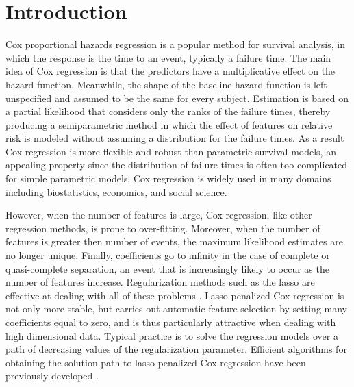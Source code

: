 \section{Introduction}

Cox proportional hazards regression \citep{cox1972regression} is a popular method for survival analysis, in which the response is the time to an event, typically a failure time. The main idea of Cox regression is that the predictors have a multiplicative effect on the hazard function. Meanwhile, the shape of the baseline hazard function is left unspecified and assumed to be the same for every subject. Estimation is based on a partial likelihood that considers only the ranks of the failure times, thereby producing a semiparametric method in which the effect of features on relative risk is modeled without assuming a distribution for the failure times. As a result Cox regression is more flexible and robust than parametric survival models, an appealing property since the distribution of failure times is often too complicated for simple parametric models. Cox regression is widely used in many domains including biostatistics, economics, and social science.

However, when the number of features is large, Cox regression, like other regression methods, is prone to over-fitting. Moreover, when the number of features is greater then number of events, the maximum likelihood estimates are no longer unique. Finally, coefficients go to infinity in the case of complete or quasi-complete separation, an event that is increasingly likely to occur as the number of features increase. Regularization methods such as the lasso are effective at dealing with all of these problems \citep{tibshirani1997lasso}. Lasso penalized Cox regression is not only more stable, but carries out automatic feature selection by setting many coefficients equal to zero, and is thus particularly attractive when dealing with high dimensional data. Typical practice is to solve the regression models over a path of decreasing values of the regularization parameter. Efficient algorithms for obtaining the solution path to lasso penalized Cox regression have been previously developed \citep{simon2011regularization}.

